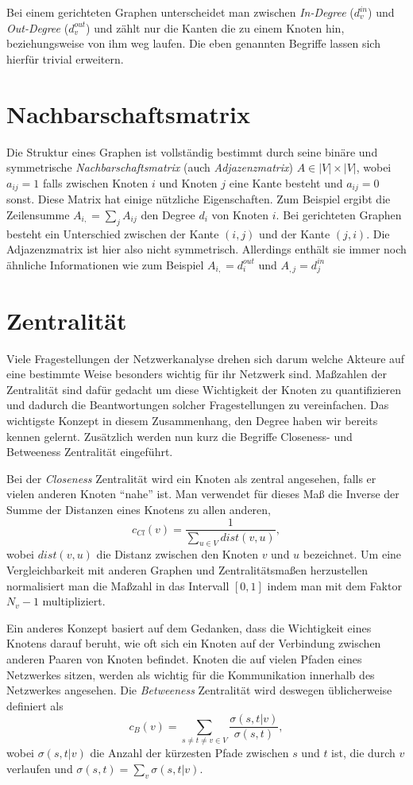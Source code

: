 \documentclass[a4paper,ngerman,oneside,titlepage,bibliography=totoc,11pt]{scrreprt}
\begin{document}
Bei einem gerichteten Graphen unterscheidet man zwischen \emph{In-Degree} ($d_v^{in}$) und \emph{Out-Degree} ($d_v^{out}$) und zählt nur die Kanten die zu einem Knoten hin, beziehungsweise von ihm weg laufen. Die eben genannten Begriffe lassen sich hierfür trivial erweitern.

\section{Nachbarschaftsmatrix}

Die Struktur eines Graphen ist vollständig bestimmt durch seine binäre und symmetrische\emph{ Nachbarschaftsmatrix} (auch \emph{Adjazenzmatrix}) $A \in |V| \times |V|$, wobei $a_{ij} = 1$ falls zwischen Knoten $i$ und Knoten $j$ eine Kante besteht und $a_{ij} = 0$ sonst. Diese Matrix hat einige nützliche Eigenschaften. Zum Beispiel ergibt die Zeilensumme $A_{i,} = \sum_j{A_{ij}}$ den Degree $d_i$ von Knoten $i$.  
Bei gerichteten Graphen besteht ein Unterschied zwischen der Kante $(i,j)$ und der Kante $(j,i)$. Die Adjazenzmatrix ist hier also nicht symmetrisch. Allerdings enthält sie immer noch ähnliche Informationen wie zum Beispiel $A_{i,} = d_i^{out}$ und $A_{,j} = d_j^{in}$

\section{Zentralität}
Viele Fragestellungen der Netzwerkanalyse drehen sich darum welche Akteure auf eine bestimmte Weise besonders wichtig für ihr Netzwerk sind. Maßzahlen der Zentralität sind dafür gedacht um diese Wichtigkeit der Knoten zu quantifizieren und dadurch die Beantwortungen solcher Fragestellungen zu vereinfachen. Das wichtigste Konzept in diesem Zusammenhang, den Degree haben wir bereits kennen gelernt. Zusätzlich werden nun kurz die Begriffe Closeness- und Betweeness Zentralität eingeführt.

Bei der \emph{Closeness} Zentralität wird ein Knoten als zentral angesehen, falls er vielen anderen Knoten "`nahe"' ist.
Man verwendet für dieses Maß die Inverse der Summe der Distanzen eines Knotens zu allen anderen,
$$ c_{Cl}(v)=\frac{1}{\sum_{u \in V}{dist(v,u)}}, $$
wobei $dist(v,u)$ die Distanz zwischen den Knoten $v$ und $u$ bezeichnet. Um eine Vergleichbarkeit mit anderen Graphen und Zentralitätsmaßen herzustellen normalisiert man die Maßzahl in das Intervall $[0,1]$ indem man mit dem Faktor $N_v - 1$ multipliziert.

Ein anderes Konzept basiert auf dem Gedanken, dass die Wichtigkeit eines Knotens darauf beruht, wie oft sich ein Knoten auf der Verbindung zwischen anderen Paaren von Knoten befindet. Knoten die auf vielen Pfaden eines Netzwerkes sitzen, werden als wichtig für die Kommunikation innerhalb des Netzwerkes angesehen. 
Die \emph{Betweeness} Zentralität wird deswegen üblicherweise definiert als
$$ c_{B}(v)= \sum_{s \neq t \neq v \in V} {\frac{\sigma(s,t|v)}{\sigma(s,t)}}, $$
wobei $\sigma(s,t|v)$ die Anzahl der kürzesten Pfade zwischen $s$ und $t$ ist, die durch $v$ verlaufen und $\sigma(s,t) = \sum_v{\sigma(s,t|v)}$.
\end{document}
